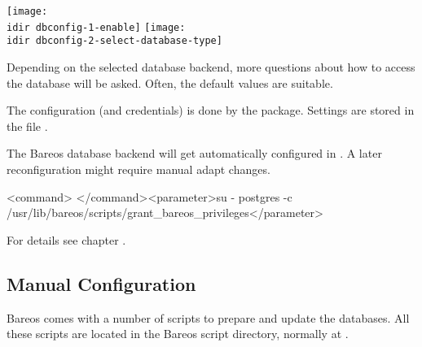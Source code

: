 \begin{center}
\texttt{[image: \\idir dbconfig-1-enable]}
\texttt{[image: \\idir dbconfig-2-select-database-type]}
\end{center}

Depending on the selected database backend,
more questions about how to access the database will be asked.
Often, the default values are suitable.

The  configuration (and credentials) is done by the  package.
Settings are stored in the file .

The Bareos database backend will get automatically configured in .
A later reconfiguration might require manual adapt changes.

\begin{commands}{}
<command> </command><parameter>su - postgres -c /usr/lib/bareos/scripts/grant_bareos_privileges</parameter>
\end{commands}
For details see chapter .



\subsection{Manual Configuration}
    \label{CatMaintenanceManualConfiguration}

Bareos comes with a number of scripts to prepare and update the databases. All these scripts are located in the Bareos script directory, normally at \scriptPathUnix.

